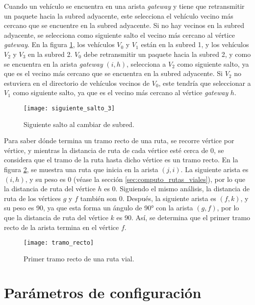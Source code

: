 Cuando un vehículo se encuentra en una arista \textit{gateway} y tiene que
retransmitir un paquete hacia la subred adyacente, este selecciona el vehículo
vecino más cercano que se encuentre en la subred adyacente. Si no hay vecinos
en la subred adyacente, se selecciona como siguiente salto el vecino más
cercano al vértice \textit{gateway}. En la figura \ref{fig:siguiente_salto_3},
los vehículos $V_0$ y $V_1$ están en la subred 1, y los vehículos $V_2$ y $V_3$
en la subred 2. $V_0$ debe retransmitir un paquete hacia la subred 2, y como se
encuentra en la arista \textit{gateway} $(i,h)$, selecciona a $V_2$ como
siguiente salto, ya que es el vecino más cercano que se encuentra en la subred
adyacente. Si $V_2$ no estuviera en el directorio de vehículos vecinos de $V_0$,
este tendría que seleccionar a $V_1$ como siguiente salto, ya que es el vecino
más cercano al vértice \textit{gateway} $h$.

\begin{figure}[th!]
\centering
\texttt{[image: siguiente\_salto\_3]}
\decoRule
\caption[Siguiente salto al cambiar de subred]{Siguiente salto al cambiar de
subred.}
\label{fig:siguiente_salto_3}
\end{figure}

Para saber dónde termina un tramo recto de una ruta, se recorre vértice por
vértice, y mientras la distancia de ruta de cada vértice esté cerca de 0, se
considera que el tramo de la ruta hasta dicho vértice es un tramo recto. En la
figura \ref{fig:tramo_recto}, se muestra una ruta que inicia en la arista
$(j,i)$. La siguiente arista es $(i,h)$, y su peso es 0 (véase la sección
\ref{sec:computo_rutas_viales}), por lo que la distancia de ruta del vértice
$h$ es 0. Siguiendo el mismo análisis, la distancia de ruta de los vértices
$g$ y $f$ también son 0. Después, la siguiente arista es $(f,k)$, y su peso es
90, ya que esta forma un ángulo de 90\si{\degree} con la arista $(g,f)$, por lo
que la distancia de ruta del vértice $k$ es 90. Así, se determina que el primer
tramo recto de la arista termina en el vértice $f$.

\begin{figure}[th!]
\centering
\texttt{[image: tramo\_recto]}
\decoRule
\caption[Primer tramo recto de una ruta vial]{Primer tramo recto de una ruta
vial.}
\label{fig:tramo_recto}
\end{figure}

\section{Parámetros de configuración}
\label{sec:parametros_configuracion}

